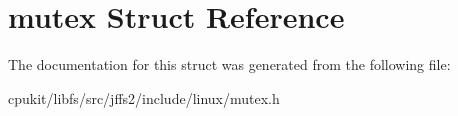 \hypertarget{structmutex}{}\section{mutex Struct Reference}
\label{structmutex}


The documentation for this struct was generated from the following file\+:\begin{DoxyCompactItemize}
\item 
cpukit/libfs/src/jffs2/include/linux/mutex.\+h\end{DoxyCompactItemize}
